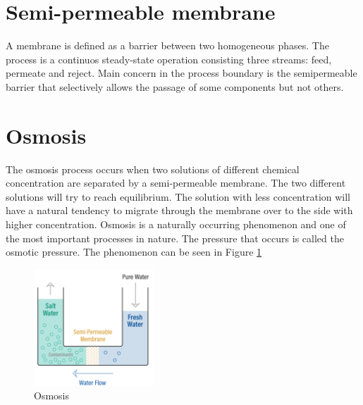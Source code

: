 
\section{Semi-permeable membrane}
\label{membrane}
A membrane is defined as a barrier between two homogeneous phases. The process is a continuos steady-state operation consisting three streams: feed, permeate and reject. Main concern in the process boundary is the semipermeable barrier that selectively allows the passage of some components but not others. \cite{Singh}

\section{Osmosis} 
\label{osmosis}
The osmosis process occurs when two solutions of different chemical concentration are separated by a semi-permeable membrane. The two different solutions will try to reach equilibrium. The solution with less concentration will have a natural tendency to migrate through the membrane over to the side with higher concentration.  
Osmosis is a naturally occurring phenomenon and one of the most important processes in nature. The pressure that occurs is called the osmotic pressure. The phenomenon can be seen in Figure \ref{fig:osmosis}

\begin{figure}[h]
    \centering
    \includegraphics[width=0.4\textwidth]{Osmosis}
    \caption{Osmosis}
    \label{fig:osmosis}
\end{figure}


